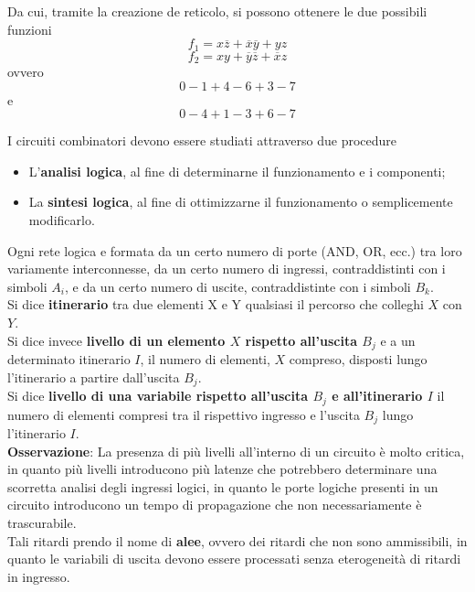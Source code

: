 \documentclass[a4paper]{extarticle}
\begin{document}
\vspace{1em}
\noindent
Da cui, tramite la creazione de reticolo, si possono ottenere le due possibili funzioni
\[f_1 = x \overline{z} + \overline{x} \overline{y} + yz\]
\[f_2 = x y + \overline{y} \overline{z} + \overline{x} z\]
ovvero
\[0 - 1 + 4 - 6 + 3 - 7\]
e
\[0 - 4 + 1 - 3 + 6 - 7\]

\vspace{1em}
\noindent
I circuiti combinatori devono essere studiati attraverso due procedure
\begin{itemize}
    \item L'\textbf{analisi logica}, al fine di determinarne il funzionamento e i componenti;
    \item La \textbf{sintesi logica}, al fine di ottimizzarne il funzionamento o semplicemente modificarlo.
\end{itemize}

\vspace{1em}
\noindent
Ogni rete logica e formata da un certo numero di porte (AND, OR, ecc.) tra loro variamente interconnesse, da un certo numero di ingressi, contraddistinti con i simboli \(A_i\), e da un certo numero di uscite, contraddistinte con i simboli \(B_k\).\\
Si dice \textbf{itinerario} tra due elementi X e Y qualsiasi il percorso che colleghi \(X\) con \(Y\).\\
Si dice invece \textbf{livello di un elemento \(X\) rispetto all’uscita \(B_j\)} e a un determinato
itinerario \(I\), il numero di elementi, \(X\) compreso, disposti lungo l’itinerario a partire dall’uscita \(B_j\).\\
Si dice \textbf{livello di una variabile rispetto all’uscita \(B_j\) e all’itinerario \(I\)} il numero di elementi compresi tra il rispettivo ingresso e l’uscita \(B_j\) lungo l’itinerario \(I\).\\

\vspace{1em}
\noindent
\textbf{Osservazione}: La presenza di più livelli all'interno di un circuito è molto critica, in quanto più livelli introducono più latenze che potrebbero determinare una scorretta analisi degli ingressi logici, in quanto le porte logiche presenti in un circuito introducono un tempo di propagazione che non necessariamente è trascurabile.\\
Tali ritardi prendo il nome di \textbf{alee}, ovvero dei ritardi che non sono ammissibili, in quanto le variabili di uscita devono essere processati senza eterogeneità di ritardi in ingresso.
\end{document}
